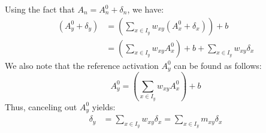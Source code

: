 \documentclass{article}
\begin{document}
Using the fact that $A_n = A_n^0 + \delta_n$, we have:
\begin{equation}
\begin{aligned}
(A_y^0 + \delta_y) &= \left(\sum_{x \in I_y} w_{xy} (A_x^0 + \delta_x) \right) + b \\
                              &= \left(\sum_{x \in I_y} w_{xy} A_x^0 \right) + b + \sum_{x \in I_y} w_{xy} \delta_x
\end{aligned}
\end{equation} 
We also note that the reference activation $A_y^0$ can be found as follows:
\begin{equation}
A_y^0 = \left(\sum_{x \in I_y} w_{xy} A_x^0 \right) + b
\end{equation}
Thus, canceling out $A_y^0$ yields:
\begin{equation}
\begin{aligned}
\delta_y &= \sum_{x \in I_y} w_{xy} \delta_x = \sum_{x \in I_y} m_{xy} \delta_x
\end{aligned}
\end{equation} 



\end{document}
